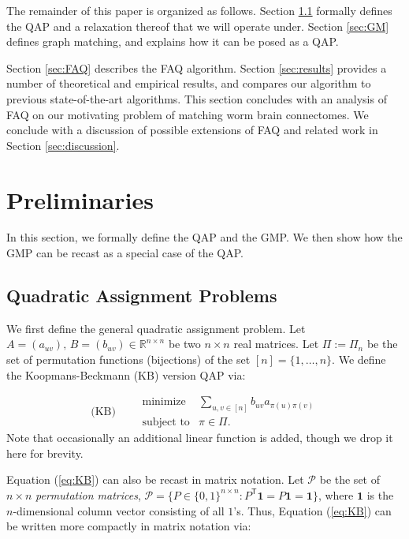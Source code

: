 \documentclass[10pt]{article}
\providecommand{\mc}[1]{\mathcal{#1}}
\providecommand{\mb}[1]{\boldsymbol{#1}}
\providecommand{\mc}[1]{\mathcal{#1}}
\providecommand{\mb}[1]{\boldsymbol{#1}}
\newcommand{\T}{^{\ensuremath{\mathsf{T}}}}
\begin{document}
The remainder of this paper is organized as follows. 
Section \ref{sec:QAP} formally defines the QAP and a relaxation thereof that we will operate under.  Section \ref{sec:GM} defines graph matching, and explains how it can be posed as a QAP. 

Section \ref{sec:FAQ} describes the FAQ algorithm.  Section \ref{sec:results} provides a number of theoretical and empirical results, and compares our algorithm to previous state-of-the-art algorithms.  This section concludes with an analysis of FAQ on our motivating problem of matching worm brain connectomes. We conclude with a discussion of possible extensions of FAQ and related work in Section \ref{sec:discussion}.

\section{Preliminaries}
In this section, we formally define the QAP and the GMP.  We then show how the GMP can be recast as a special case of the QAP.
\subsection{Quadratic Assignment Problems} 
\label{sec:QAP}

We first define the general quadratic assignment problem.  
Let $A=(a_{uv}),\,B=(b_{uv})\in\mathbb{R}^{n\times n}$ be two $n \times n$ real matrices.
Let $\Pi:=\Pi_n$ be the set of permutation functions (bijections) of the set
$[n]=\{1,\ldots, n\}$. We define the Koopmans-Beckmann (KB) version QAP via:

\begin{equation}
\text{(KB)} \qquad  
\begin{array}{cl}
			\text{minimize}   &\sum_{u,v \in [n]} b_{uv}a_{\pi(u)\pi(v)} \\
			\text{subject to}  &\pi \in \Pi  .
\end{array}\label{eq:KB}
\end{equation}
Note that occasionally an additional linear function is added, though we drop it here for brevity.

Equation (\ref{eq:KB}) can also be recast in matrix notation. Let $\mc{P}$ be the set of  $n \times n$ \emph{permutation matrices}, $\mc{P}=\{P\in \{0,1\}^{n \times n} : P\T \mb{1} = P \mb{1} = \mb{1} \}$, where $\mb{1}$ is the $n$-dimensional column vector consisting of all $1$'s. 
Thus, Equation (\ref{eq:KB}) can be written more compactly in matrix notation via:
\end{document}
